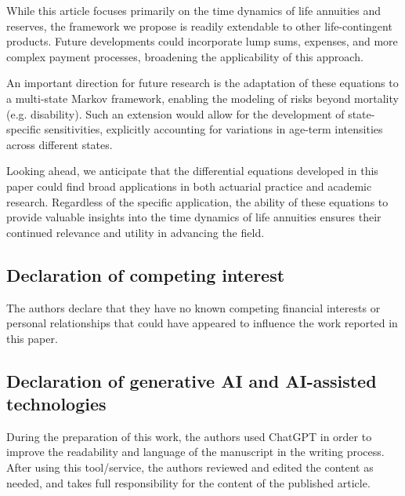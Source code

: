 \documentclass[12pt]{article}
\begin{document}
While this article focuses primarily on the time dynamics of life annuities and reserves, the framework we propose is readily extendable to other life-contingent products. Future developments could incorporate lump sums, expenses, and more complex payment processes, broadening the applicability of this approach.

An important direction for future research is the adaptation of these equations to a multi-state Markov framework, enabling the modeling of risks beyond mortality (e.g. disability). Such an extension would allow for the development of state-specific sensitivities, explicitly accounting for variations in age-term intensities across different states.

Looking ahead, we anticipate that the differential equations developed in this paper could find broad applications in both actuarial practice and academic research. Regardless of the specific application, the ability of these equations to provide valuable insights into the time dynamics of life annuities ensures their continued relevance and utility in advancing the field.

\subsection*{Declaration of competing interest}

The authors declare that they have no known competing financial
interests or personal relationships that could have appeared to influence the work reported in this paper.

\subsection*{Declaration of generative AI and AI-assisted technologies}

During the preparation of this work, the authors used ChatGPT in
order to improve the readability and language of the manuscript in the
writing process. After using this tool/service, the authors reviewed
and edited the content as needed, and takes full responsibility for the content of the published article.


%
%



\newpage


\FloatBarrier
\newpage
\appendix
\end{document}
